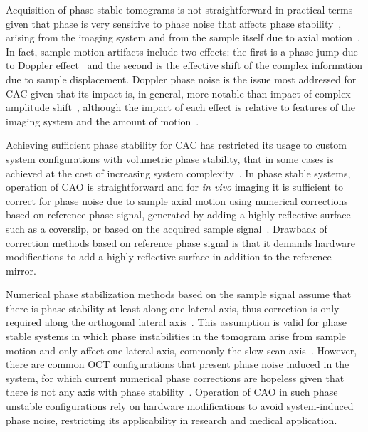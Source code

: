 Acquisition of phase stable tomograms is not straightforward in practical terms given that phase is very sensitive to phase noise that affects phase stability~\cite{Shemonski2014_Stability, Vakoc2005_Phaseresolved}, arising from the imaging system and from the sample itself due to axial motion~\cite{Shemonski2014_Stability-1, Shemonski2014_Threedimensional}. In fact, sample motion artifacts include two effects: the first is a phase jump due to Doppler effect~\cite{Chen1997_Optical, White2003_vivo} and the second is the effective shift of the complex information due to sample displacement. Doppler phase noise is the issue most addressed for CAC given that its impact is, in general, more notable than impact of complex-amplitude shift~\cite{Shemonski2014_Stability-1, Shemonski2014_Threedimensional}, although the impact of each effect is relative to features of the imaging system and the amount of motion~\cite{Shemonski2014_Stability}.

Achieving sufficient phase stability for CAC has restricted its usage to custom system configurations with volumetric phase stability, that in some cases is achieved at the cost of increasing system complexity~\cite{Ginner2018_Holographic, Kumar2013_Subaperture, Hillmann2016_Aberrationfree, Sudkamp2018_Simple}. In phase stable systems, operation of CAO is straightforward and for \textit{in vivo} imaging it is sufficient to correct for phase noise due to sample axial motion using numerical corrections based on reference phase signal, generated by adding a highly reflective surface such as a coverslip, or based on the acquired sample signal~\cite{White2003_vivo, Ralston2006_Phase}. Drawback of correction methods based on reference phase signal is that it demands hardware modifications to add a highly reflective surface in addition to the reference mirror.

Numerical phase stabilization methods based on the sample signal assume that there is phase stability at least along one lateral axis, thus correction is only required along the orthogonal lateral axis~\cite{Shemonski2014_Threedimensional}. This assumption is valid for phase stable systems in which phase instabilities in the tomogram arise from sample motion and only affect one lateral axis, commonly the slow scan axis~\cite{Shemonski2014_Threedimensional}. However, there are common OCT configurations that present phase noise induced in the system, for which current numerical phase corrections are hopeless given that there is not any axis with phase stability~\cite{Vakoc2005_Phaseresolved}. Operation of CAO in such phase unstable configurations rely on hardware modifications to avoid system-induced phase noise, restricting its applicability in research and medical application.

